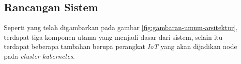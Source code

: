 \subsection{Rancangan Sistem}
Seperti yang telah digambarkan pada gambar \ref{fig:gambaran-umum-arsitektur}, terdapat tiga komponen utama yang menjadi dasar dari sistem, selain itu terdapat beberapa tambahan berupa perangkat \textit{IoT} yang akan dijadikan node pada \textit{cluster kubernetes}.
